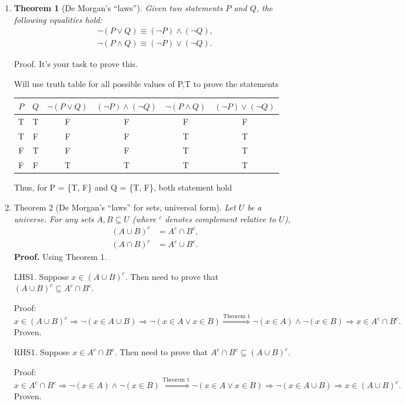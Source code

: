 \documentclass[12pt]{article}
\begin{document}
\begin{enumerate}
    \item \textbf{Theorem 1} (De Morgan's ``laws''). \textit{Given two statements \(P\) and \(Q\), the following equalities hold:}
\begin{gather*}
    \neg(P \lor Q) \equiv (\neg P) \land (\neg Q), \\
    \neg(P \land Q) \equiv (\neg P) \lor (\neg Q).
\end{gather*}

    Proof. It’s your task to prove this.

    Will use truth table for all possible values of P,T to prove the statements

    \begin{tabular}{|c|c|c|c|c|c|}
    \hline
    \(P\) & \(Q\) & \(\neg(P \lor Q)\) & \((\neg P) \land (\neg Q)\) & \(\neg(P \land Q)\) & \((\neg P) \lor (\neg Q)\) \\
    \hline
    T & T & F & F & F & F \\
    \hline
    T & F & F & F & T & T \\
    \hline
    F & T & F & F & T & T \\
    \hline
    F & F & T & T & T & T \\
    \hline
    \end{tabular}

    Thus, for P = \{T, F\} and Q = \{T, F\}, both statement hold


\item {Theorem 2} (De Morgan's ``laws'' for sets, universal form). \textit{Let \(U\) be a universe. For any sets \(A, B \subseteq U\) (where \(^c\) denotes complement relative to \(U\)),}
\begin{align}
(A \cup B)^c &= A^c \cap B^c, \\
(A \cap B)^c &= A^c \cup B^c.
\end{align}
\noindent \textbf{Proof.} Using Theorem 1.

LHS1. Suppose \(x \in (A \cup B)^c\). Then need to prove that \((A \cup B)^c \subseteq A^c \cap B^c\).

Proof:
\[
x \in (A \cup B)^c
\Rightarrow \neg(x \in A \cup B)
\Rightarrow \neg(x \in A \lor x \in B)
\overset{\text{Theorem 1}}{\Rightarrow} \neg(x \in A) \land \neg(x \in B)
\Rightarrow x \in A^c \cap B^c.
\]
Proven.

RHS1. Suppose \(x \in A^c \cap B^c\). Then need to prove that \(A^c \cap B^c \subseteq (A \cup B)^c\).

Proof:
\[
x \in A^c \cap B^c
\Rightarrow \neg(x \in A) \land \neg(x \in B)
\overset{\text{Theorem 1}}{\Rightarrow} \neg(x \in A \lor x \in B)
\Rightarrow \neg(x \in A \cup B)
\Rightarrow x \in (A \cup B)^c.
\]
Proven.


\end{enumerate}
\end{document}
